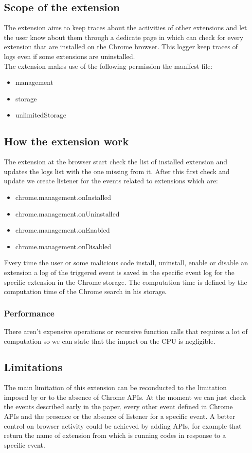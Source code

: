 \documentclass[12pt]{article}
\begin{document}
\begin{multicols}{2}
\subsection*{Scope of the extension}

The extension aims to keep traces about the activities of other extensions and let the user know
about them through a dedicate page in which can check for every extension that are installed on the
Chrome browser. This logger keep traces of logs even if some extensions are uninstalled. \\
The extension makes use of the following permission the manifest file:
\begin{itemize}
	\item  management
	\item  storage
	\item  unlimitedStorage
\end{itemize}
\subsection*{How the extension work}
The extension at the browser start check the list of installed extension and updates the logs list with the one missing from it.
After this first check and update we create listener for the events related to extensions which are: 
\begin{itemize}
	\item  chrome.management.onInstalled
	\item  chrome.management.onUninstalled
	\item  chrome.management.onEnabled
	\item  chrome.management.onDisabled
\end{itemize}
Every time the user or some malicious code install, uninstall, enable or disable an extension a log of the triggered event is saved in the specific event log for the specific extension in the Chrome storage.
The computation time is defined by the computation time of the Chrome search in his storage.
\subsubsection*{Performance}
There aren't expensive operations or recursive function calls that requires a lot of computation so we can state that the impact on the CPU is negligible.
\subsection*{Limitations}
The main limitation of this extension can be reconducted to the limitation imposed by or to the absence of Chrome APIs.
At the moment we can just check the events described early in the paper, every other event defined in Chrome APIs and the presence or the absence of listener for a specific event.
A better control on browser activity could be achieved by adding APIs, for example that return the name of extension from which is running codes in response to a specific event.

\end{multicols}
\end{document}
